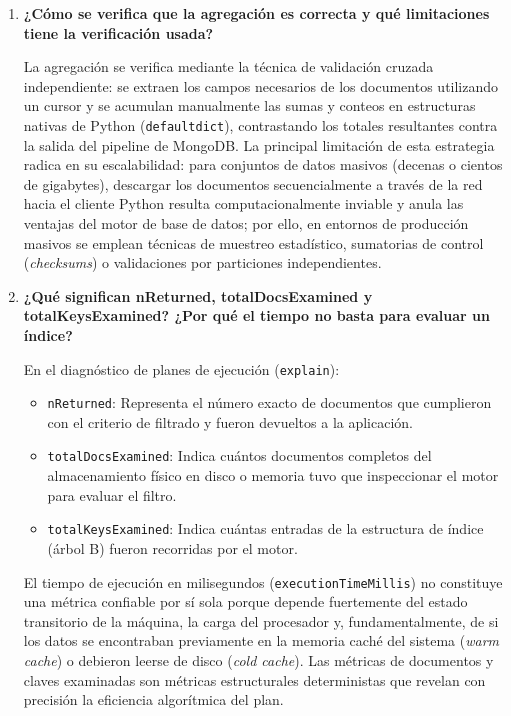 \documentclass[12pt,a4paper]{article}
\begin{document}
\begin{enumerate}
    \item \textbf{¿Cómo se verifica que la agregación es correcta y qué limitaciones tiene la verificación usada?}
    
    La agregación se verifica mediante la técnica de validación cruzada independiente: se extraen los campos necesarios de los documentos utilizando un cursor y se acumulan manualmente las sumas y conteos en estructuras nativas de Python (\texttt{defaultdict}), contrastando los totales resultantes contra la salida del pipeline de MongoDB. La principal limitación de esta estrategia radica en su escalabilidad: para conjuntos de datos masivos (decenas o cientos de gigabytes), descargar los documentos secuencialmente a través de la red hacia el cliente Python resulta computacionalmente inviable y anula las ventajas del motor de base de datos; por ello, en entornos de producción masivos se emplean técnicas de muestreo estadístico, sumatorias de control (\textit{checksums}) o validaciones por particiones independientes.

    \item \textbf{¿Qué significan nReturned, totalDocsExamined y totalKeysExamined? ¿Por qué el tiempo no basta para evaluar un índice?}
    
    En el diagnóstico de planes de ejecución (\texttt{explain}):
    \begin{itemize}
        \item \texttt{nReturned}: Representa el número exacto de documentos que cumplieron con el criterio de filtrado y fueron devueltos a la aplicación.
        \item \texttt{totalDocsExamined}: Indica cuántos documentos completos del almacenamiento físico en disco o memoria tuvo que inspeccionar el motor para evaluar el filtro.
        \item \texttt{totalKeysExamined}: Indica cuántas entradas de la estructura de índice (árbol B) fueron recorridas por el motor.
    \end{itemize}
    El tiempo de ejecución en milisegundos (\texttt{executionTimeMillis}) no constituye una métrica confiable por sí sola porque depende fuertemente del estado transitorio de la máquina, la carga del procesador y, fundamentalmente, de si los datos se encontraban previamente en la memoria caché del sistema (\textit{warm cache}) o debieron leerse de disco (\textit{cold cache}). Las métricas de documentos y claves examinadas son métricas estructurales deterministas que revelan con precisión la eficiencia algorítmica del plan.


\end{enumerate}
\end{document}
